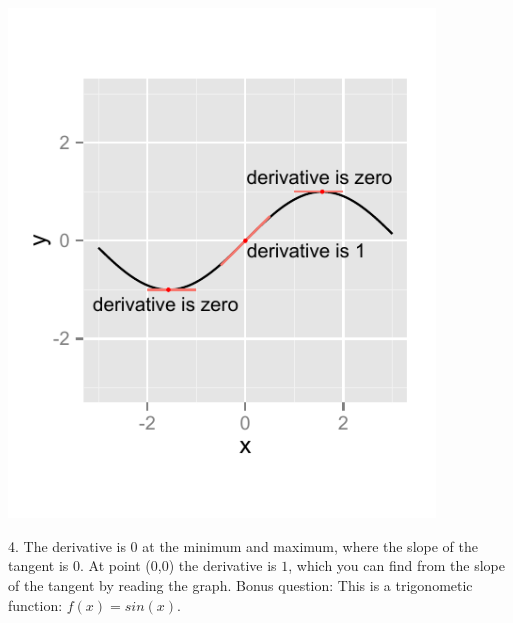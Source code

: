 \documentclass[a4paper]{report}
\begin{document}
\begin{Answer}[ref=ex0]
\begin{minipage}{\rat\textwidth}
\includegraphics[width=0.85\textwidth]{1ae.pdf}
\end{minipage}
\begin{minipage}{\rati\textwidth}
4. The derivative is $0$ at the minimum and maximum, where the slope of the tangent is $0$. At point ($0$,$0$) the derivative is $1$, which you can find from the slope of the tangent by reading the graph. Bonus question: This is a trigonometic function: $f(x)=sin(x)$.
\end{minipage}


\end{Answer}
\end{document}
